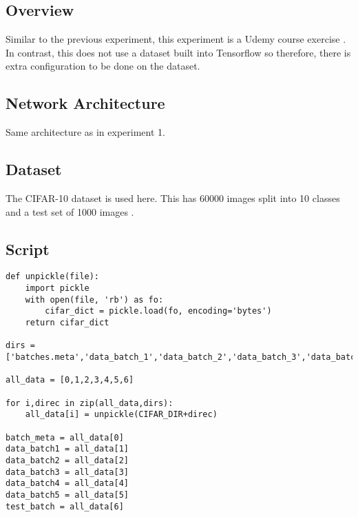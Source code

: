 \subsection*{Overview}
Similar to the previous experiment, this experiment is a Udemy course exercise \textcite{udemy}. In contrast, this does not use a dataset built into Tensorflow so therefore, there is extra configuration to be done on the dataset.

\subsection*{Network Architecture}
Same architecture as in experiment 1.

\subsection*{Dataset}
The CIFAR-10 dataset is used here. 
This has 60000 images split into 10 classes and a test set of 1000 images \textcite{cifar}.

\subsection*{Script}
\begin{lstlisting}
def unpickle(file):
    import pickle
    with open(file, 'rb') as fo:
        cifar_dict = pickle.load(fo, encoding='bytes')
    return cifar_dict

dirs = ['batches.meta','data_batch_1','data_batch_2','data_batch_3','data_batch_4','data_batch_5','test_batch']

all_data = [0,1,2,3,4,5,6]

for i,direc in zip(all_data,dirs):
    all_data[i] = unpickle(CIFAR_DIR+direc)

batch_meta = all_data[0]
data_batch1 = all_data[1]
data_batch2 = all_data[2]
data_batch3 = all_data[3]
data_batch4 = all_data[4]
data_batch5 = all_data[5]
test_batch = all_data[6]
\end{lstlisting}

